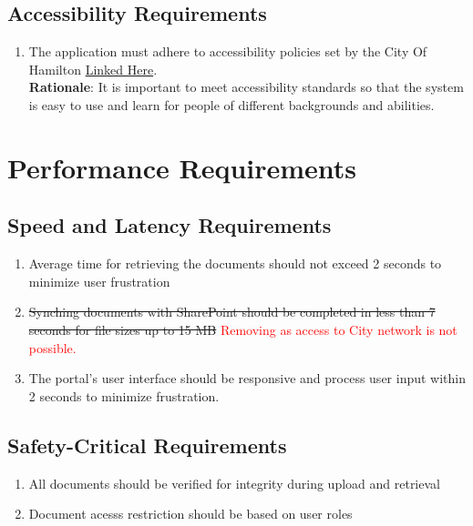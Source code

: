\documentclass[12pt]{article}
\begin{document}
\subsection{Accessibility Requirements}
\begin{enumerate}[{UH-AS}1.]
  \item The application must adhere to accessibility policies set by the City Of
    Hamilton
    \href{https://www.hamilton.ca/people-programs/inclusion-diversity-equity-accessibility/accessibility-services/accessibility#policies-procedures}{Linked
    Here}.\\
    \textbf{Rationale}: It is important to meet accessibility standards so that
    the system is easy to use and learn for people of different backgrounds and
    abilities.
\end{enumerate}
\section{Performance Requirements}
\subsection{Speed and Latency Requirements}
\begin{enumerate}[{PR-SL}1.]
  \item Average time for retrieving the documents should not exceed 2
    seconds to minimize user frustration
  \item \sout{Synching documents with SharePoint should be completed in
    less than 7 seconds for file sizes up to 15 MB}
    \textcolor{red}{Removing as access to City network is not possible.}
  \item The portal's user interface should be responsive and process
    user input within 2 seconds to minimize frustration.
\end{enumerate}
\subsection{Safety-Critical Requirements}
\begin{enumerate}[{PR-SC}1.]
  \item All documents should be verified for integrity during upload
    and retrieval
  \item Document acesss restriction should be based on user roles
\end{enumerate}
\end{document}
